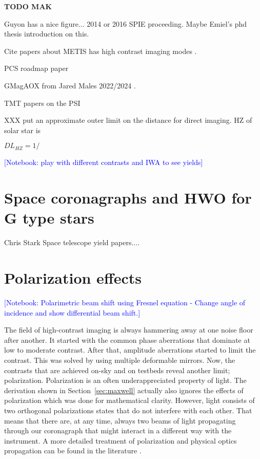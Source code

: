 \documentclass[letterpaper]{ar-1col}
\newcommand{\notebooksuggestion}[1]{\textcolor{blue}{[Notebook: #1]}}
\begin{document}
{\bf TODO MAK}

Guyon has a nice figure... 2014 or 2016 SPIE proceeding. Maybe Emiel's phd thesis introduction on this.

Cite papers about METIS \citep{Brandl21} has high contrast imaging modes \citep{Kenworthy16,Carlomagno20}.

PCS roadmap paper \citep{Kasper21}

GMagAOX from Jared Males 2022/2024 \citep{Males22}.

TMT papers on the PSI \citet{Jensen-Clem22,Fitzgerald22}


XXX put an approximate outer limit on the distance for direct imaging. HZ of solar star is 

$DL_{HZ} = 1/$

\notebooksuggestion{play with different contrasts and IWA to see yields}


\section{Space coronagraphs and HWO for G type stars}

Chris Stark Space telescope yield papers...\citep{Stark14,Stark24}.

\lipsum[2-4]



\section{Polarization effects} 

\notebooksuggestion{Polarimetric beam shift using Fresnel equation - Change angle of incidence and show differential beam shift.}

The field of high-contrast imaging is always hammering away at one noise floor after another. It started with the common phase aberrations that dominate at low to moderate contrast. After that, amplitude aberrations started to limit the contrast. This was solved by using multiple deformable mirrors. Now, the contrasts that are achieved on-sky and on testbeds reveal another limit; polarization. Polarization is an often underappreciated property of light. The derivation shown in Section~\ref{sec:maxwell} actually also ignores the effects of polarization which was done for mathematical clarity. However, light consists of two orthogonal polarizations states that do not interfere with each other. That means that there are, at any time, always two beams of light propagating through our coronagraph that might interact in a different way with the instrument. A more detailed treatment of polarization and physical optics propagation can be found in the literature \citep{McLeod14}.
\end{document}
